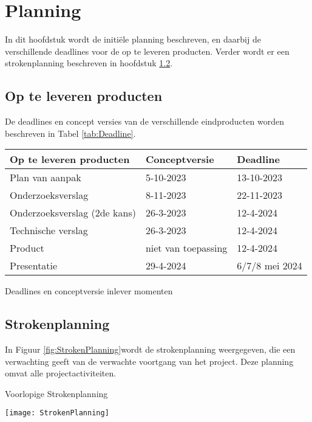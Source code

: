 \chapter{Planning}
In dit hoofdstuk wordt de initiële planning beschreven, en daarbij de verschillende deadlines voor de op te leveren producten.
Verder wordt er een strokenplanning beschreven in hoofdstuk \ref{sec:strokenplanning}.
\section{Op te leveren producten}
De deadlines en concept versies van de verschillende eindproducten worden beschreven in Tabel \ref{tab:Deadline}.

\whitespace[2]
\begin{graphic}
	\captionsetup{type=table}
	\begin{tabularx}{\textwidth}{|l|l|X|}
		\hline
		\textbf{Op te leveren producten} & \textbf{Conceptversie} & \textbf{Deadline}        \\
		\hline
		Plan van aanpak                  & 5-10-2023              & 13-10-2023               \\
		\hline
		Onderzoeksverslag                & 8-11-2023              & 22-11-2023               \\
		\hline
		Onderzoeksverslag (2de kans)     & 26-3-2023              & 12-4-2024                 \\
		\hline
		Technische verslag               & 26-3-2023              & 12-4-2024                 \\
		\hline
		Product                          & niet van toepassing    & 12-4-2024                 \\
		\hline
		Presentatie                      & 29-4-2024              & 6/7/8 mei 2024 \\
		\hline
	\end{tabularx}
	\caption{Deadlines en conceptversie inlever momenten}
	\label{tab:Deadline}
	\vspace{0.2cm}
\end{graphic}
\section{Strokenplanning}
\label{sec:strokenplanning}
In Figuur \ref{fig:StrokenPlanning}wordt de strokenplanning weergegeven, die een verwachting geeft van de verwachte voortgang van het project.
Deze planning omvat alle projectactiviteiten.

\whitespace[2]
\begin{graphic}
	\captionsetup{type=figure}
	\caption{Voorlopige Strokenplanning}
	\texttt{[image: StrokenPlanning]}
	\label{fig:StrokenPlanning}
\end{graphic}
